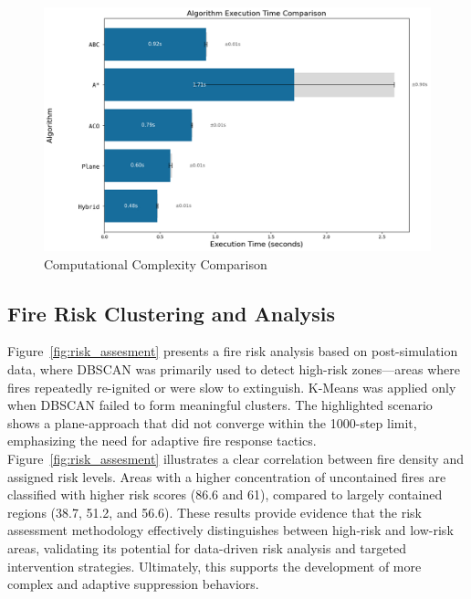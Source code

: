 \documentclass[11pt, a4paper]{article}
\begin{document}
\begin{figure}[!htbp]
    \centering
    \includegraphics[width=1\linewidth]{figures/computational.jpg}
    \caption{Computational Complexity Comparison}
    \label{fig:computational_complexity_comparison}
\end{figure}

\subsection{Fire Risk Clustering and Analysis}
\label{sec:risk_assesment}

Figure~\ref{fig:risk_assesment} presents a fire risk analysis based on post-simulation data, where DBSCAN was primarily used to detect high-risk zones—areas where fires repeatedly re-ignited or were slow to extinguish. K-Means was applied only when DBSCAN failed to form meaningful clusters. The highlighted scenario shows a plane-approach that did not converge within the 1000-step limit, emphasizing the need for adaptive fire response tactics. Figure~\ref{fig:risk_assesment} illustrates a clear correlation between fire density and assigned risk levels. Areas with a higher concentration of uncontained fires are classified with higher risk scores (86.6 and 61), compared to largely contained regions (38.7, 51.2, and 56.6). These results provide evidence that the risk assessment methodology effectively distinguishes between high-risk and low-risk areas, validating its potential for data-driven risk analysis and targeted intervention strategies. Ultimately, this supports the development of more complex and adaptive suppression behaviors.
\end{document}
